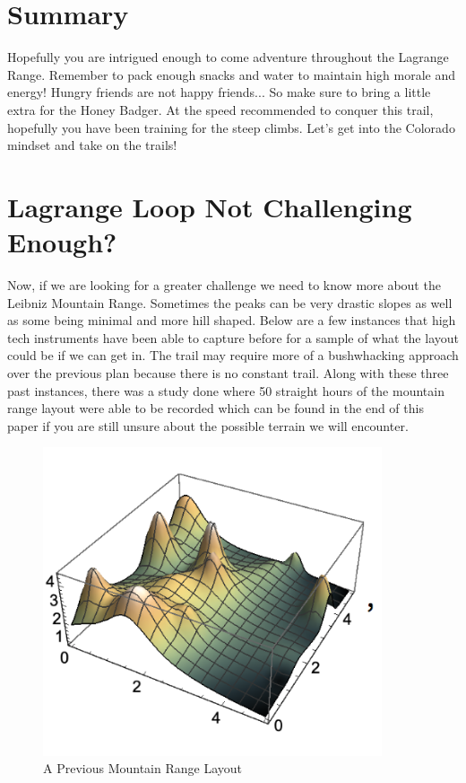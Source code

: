 \documentclass[12pt]{article}   %
\theoremstyle{definition}
\numberwithin{equation}{section}
\begin{document}
\section{Summary} \label{APPM2350proj02sec06}

\quad Hopefully you are intrigued enough to come adventure throughout the Lagrange Range. Remember to pack enough snacks and water to maintain high morale and energy! Hungry friends are not happy friends... So make sure to bring a little extra for the Honey Badger. At the speed recommended to conquer this trail, hopefully you have been training for the steep climbs. Let's get into the Colorado mindset and take on the trails!
\newpage
\section{Lagrange Loop Not Challenging Enough?} \label{APPM2350proj02sec07}

\quad  Now, if we are looking for a greater challenge we need to know more about the Leibniz Mountain Range. Sometimes the peaks can be very drastic slopes as well as some being minimal and more hill shaped. Below are a few instances that high tech instruments have been able to capture before for a sample of what the layout could be if we can get in. The trail may require more of a bushwhacking approach over the previous plan because there is no constant trail. Along with these three past instances, there was a study done where 50 straight hours of the mountain range layout were able to be recorded which can be found in the end of this paper if you are still unsure about the possible terrain we will encounter.

\begin{figure} [h]
  \centering
  \includegraphics[width=10cm]{../images/mtn1.png}
  \caption{A Previous Mountain Range Layout}
\end{figure}
\end{document}
